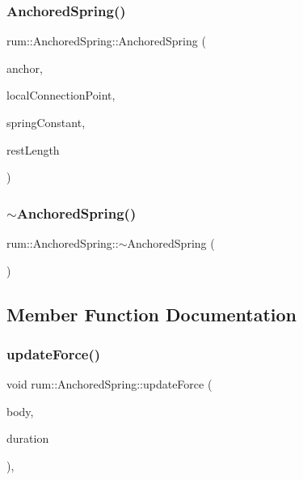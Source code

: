 \subsubsection{\texorpdfstring{Anchored\+Spring()}{AnchoredSpring()}}
{\footnotesize\ttfamily rum\+::\+Anchored\+Spring\+::\+Anchored\+Spring (\begin{DoxyParamCaption}\item[{const glm\+::vec3 \&}]{anchor,  }\item[{const glm\+::vec3 \&}]{local\+Connection\+Point,  }\item[{\mbox{\hyperlink{namespacerum_a7e8cca23573d5eaead0f138cbaa4862c}{real}}}]{spring\+Constant,  }\item[{\mbox{\hyperlink{namespacerum_a7e8cca23573d5eaead0f138cbaa4862c}{real}}}]{rest\+Length }\end{DoxyParamCaption})\hspace{0.3cm}{\ttfamily [explicit]}}

\mbox{\label{classrum_1_1_anchored_spring_a674ab5042f8a16e50f6635b2b7737b86}} 
\subsubsection{\texorpdfstring{$\sim$\+Anchored\+Spring()}{~AnchoredSpring()}}
{\footnotesize\ttfamily rum\+::\+Anchored\+Spring\+::$\sim$\+Anchored\+Spring (\begin{DoxyParamCaption}{ }\end{DoxyParamCaption})\hspace{0.3cm}{\ttfamily [default]}}



\subsection{Member Function Documentation}
\mbox{\label{classrum_1_1_anchored_spring_aeb146ac725ea6f9ee9c52b322ba70452}} 
\subsubsection{\texorpdfstring{update\+Force()}{updateForce()}}
{\footnotesize\ttfamily void rum\+::\+Anchored\+Spring\+::update\+Force (\begin{DoxyParamCaption}\item[{\mbox{\hyperlink{classrum_1_1_rigid_body}{Rigid\+Body}} $\ast$}]{body,  }\item[{\mbox{\hyperlink{namespacerum_a7e8cca23573d5eaead0f138cbaa4862c}{real}}}]{duration }\end{DoxyParamCaption})\hspace{0.3cm}{\ttfamily [override]}, {\ttfamily [virtual]}}



